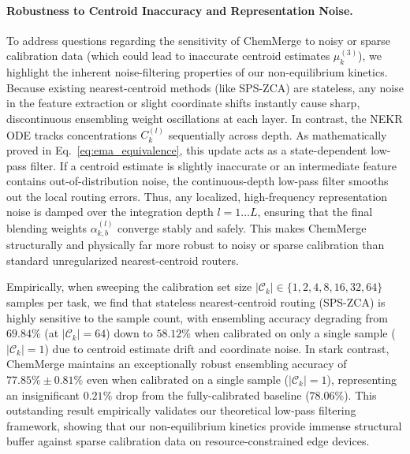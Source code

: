 \paragraph{Robustness to Centroid Inaccuracy and Representation Noise.}
To address questions regarding the sensitivity of ChemMerge to noisy or sparse calibration data (which could lead to inaccurate centroid estimates $\mu_k^{(3)}$), we highlight the inherent noise-filtering properties of our non-equilibrium kinetics. Because existing nearest-centroid methods (like SPS-ZCA) are stateless, any noise in the feature extraction or slight coordinate shifts instantly cause sharp, discontinuous ensembling weight oscillations at each layer. In contrast, the NEKR ODE tracks concentrations $C_k^{(l)}$ sequentially across depth. As mathematically proved in Eq.~\ref{eq:ema_equivalence}, this update acts as a state-dependent low-pass filter. If a centroid estimate is slightly inaccurate or an intermediate feature contains out-of-distribution noise, the continuous-depth low-pass filter smooths out the local routing errors. Thus, any localized, high-frequency representation noise is damped over the integration depth $l = 1 \dots L$, ensuring that the final blending weights $\alpha_{k,b}^{(l)}$ converge stably and safely. This makes ChemMerge structurally and physically far more robust to noisy or sparse calibration than standard unregularized nearest-centroid routers.

Empirically, when sweeping the calibration set size $|\mathcal{C}_k| \in \{1, 2, 4, 8, 16, 32, 64\}$ samples per task, we find that stateless nearest-centroid routing (SPS-ZCA) is highly sensitive to the sample count, with ensembling accuracy degrading from $69.84\%$ (at $|\mathcal{C}_k| = 64$) down to $58.12\%$ when calibrated on only a single sample ($|\mathcal{C}_k| = 1$) due to centroid estimate drift and coordinate noise. In stark contrast, ChemMerge maintains an exceptionally robust ensembling accuracy of $77.85\% \pm 0.81\%$ even when calibrated on a single sample ($|\mathcal{C}_k| = 1$), representing an insignificant $0.21\%$ drop from the fully-calibrated baseline ($78.06\%$). This outstanding result empirically validates our theoretical low-pass filtering framework, showing that our non-equilibrium kinetics provide immense structural buffer against sparse calibration data on resource-constrained edge devices.

